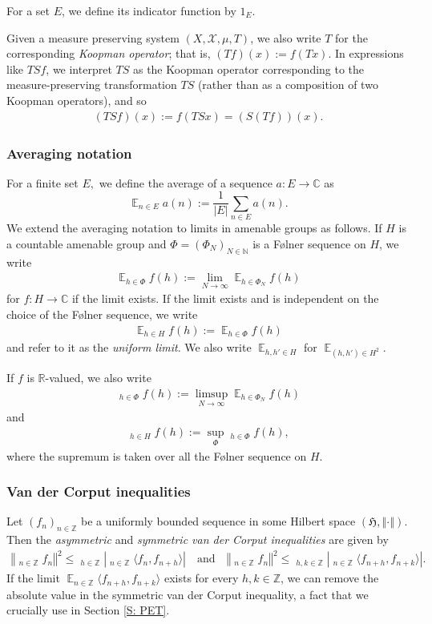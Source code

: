 \documentclass[11pt]{amsart}
\theoremstyle{definition}
\DeclareMathOperator*{\oE}{\overline{\mathbb{E}}}
\DeclareMathOperator*{\E}{\mathbb{E}}
\newcommand{\C}{{\mathbb C}}
\newcommand{\N}{{\mathbb N}}
\newcommand{\R}{{\mathbb R}}
\newcommand{\Z}{{\mathbb Z}}
\newcommand{\CX}{{\mathcal X}}
\newcommand{\norm}[1]{\left\Vert #1\right\Vert}
\newcommand{\1}{{\mathbf{1}}}
\newcommand{\abs}[1]{\mathopen{}\left| #1\mathclose{}\right|}
\begin{document}
For a set $E$, we define its indicator function by $1_E$. %

Given a measure preserving system $(X, \CX, \mu, T)$, we also write $T$ for the corresponding\textit{ Koopman operator}; that is, $(Tf)(x) := f(Tx)$. In expressions like $TSf$, we interpret $TS$ as the Koopman operator corresponding to the measure-preserving transformation $TS$ (rather than as a composition of two Koopman operators), and so
\begin{align}\label{E: composition convention}
    (TSf)(x) := f(TSx) = (S(Tf))(x).
\end{align}

\subsubsection*{Averaging notation}

For a finite set $E,$ we define the average of a sequence $a:E\to \C$ as 
\[\E_{n\in E}a(n) :=\frac{1}{|E|}\sum_{n\in E}a(n).\] 
We extend the averaging notation to limits in amenable groups as follows. If $H$ is a countable amenable group and $\Phi = (\Phi_N)_{N\in\N}$ is a F{\o}lner sequence on $H$, we write
\begin{align*}
    \E_{h\in \Phi}f(h):=\lim_{N\to\infty}\E_{h\in\Phi_N}f(h)
\end{align*}
for $f:H\to\C$ if the limit exists. If the limit exists and is independent on the choice of the F{\o}lner sequence, we write
\begin{align*}
    \E_{h\in H}f(h):=\E_{h\in\Phi}f(h)
\end{align*}
and refer to it as the \textit{uniform limit}. We also write $\E_{h,h'\in H}$ for $\E_{(h,h')\in H^2}$.

If $f$ is $\R$-valued, we also write
\begin{align*}
    \oE_{h\in \Phi}f(h):=\limsup_{N\to\infty}\E_{h\in\Phi_N}f(h)
\end{align*}
and
\begin{align*}
    \oE_{h\in H}f(h):=\sup_{\Phi}\oE_{h\in\Phi}f(h),
\end{align*}
where the supremum is taken over all the F{\o}lner sequence on $H$.

{\subsubsection*{Van der Corput inequalities}
Let $(f_n)_{n\in \Z}$ be a uniformly bounded sequence in some Hilbert space $(\mathfrak{H}, \norm{\cdot})$. Then the \textit{asymmetric} and \textit{symmetric van der Corput inequalities} are given by 
\begin{align*}
    \norm{\oE_{n\in \Z}f_n}^2\leq \oE_{h\in \Z}\abs{\oE_{n\in\Z} \langle f_n, f_{n+h}\rangle} \quad \textrm{and}\quad \norm{\oE_{n\in \Z}f_n}^2\leq \oE_{h,k\in \Z}\abs{\oE_{n\in\Z} \langle f_{n+h}, f_{n+k}\rangle}.
\end{align*}
If the limit $\E_{n\in\Z} \langle f_{n+h}, f_{n+k}\rangle$ exists for every $h,k\in\Z$, we can remove the absolute value in the symmetric van der Corput inequality, a fact that we crucially use in Section \ref{S: PET}.}
\end{document}

